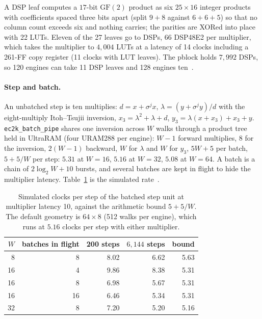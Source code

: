 A DSP leaf computes a $17$-bit $\mathrm{GF}(2)$ product as six
$25\times16$ integer products with coefficients spaced three bits
apart (split $9+8$ against $6+6+5$) so that no column count exceeds
six and nothing carries; the parities are XORed into place with 22
LUTs. Eleven of the 27 leaves go to DSPs, 66 DSP48E2 per multiplier,
which takes the multiplier to $4{,}004$ LUTs at a latency of 14 clocks
including a 261-FF copy register (11 clocks with LUT leaves). The
pblock holds $7{,}992$ DSPs, so 120 engines can take 11 DSP leaves and
128 engines ten~.

\paragraph{Step and batch.} An unbatched step is ten multiplies:
$d=x+\sigma^j x$, $\lambda=(y+\sigma^j y)/d$ with the eight-multiply
Itoh--Tsujii inversion, $x_3=\lambda^2+\lambda+d$,
$y_3=\lambda(x+x_3)+x_3+y$. \texttt{ec2k\_batch\_pipe} shares one
inversion across $W$ walks through a product tree held in UltraRAM
(four URAM288 per engine): $W-1$ forward multiplies, 8 for the
inversion, $2(W-1)$ backward, $W$ for $\lambda$ and $W$ for $y_3$,
$5W+5$ per batch, $5+5/W$ per step: $5.31$ at $W=16$, $5.16$ at $W=32$,
$5.08$ at $W=64$. A batch is a chain of $2\log_2 W+10$ bursts, and
several batches are kept in flight to hide the multiplier latency.
Table~\ref{tab:fpga-sim} is the simulated rate~.

\begin{table}[t]
\centering
\small
\caption{Simulated clocks per step of the batched step unit at
  multiplier latency 10, against the arithmetic bound $5+5/W$. The
  default geometry is $64\times8$ (512 walks per engine), which runs
  at $5.16$ clocks per step with either multiplier.}
\label{tab:fpga-sim}
\begin{tabular}{@{}rrrrr@{}}
\toprule
$W$ & batches in flight & 200 steps & $6{,}144$ steps & bound \\
\midrule
8 & 8 & 8.02 & 6.62 & 5.63 \\
16 & 4 & 9.86 & 8.38 & 5.31 \\
16 & 8 & 6.98 & 5.67 & 5.31 \\
16 & 16 & 6.46 & 5.34 & 5.31 \\
32 & 8 & 7.20 & 5.20 & 5.16 \\
\bottomrule
\end{tabular}
\end{table}

